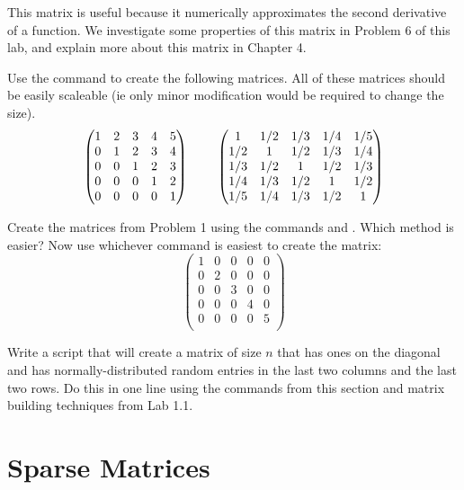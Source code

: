 This matrix is useful because it numerically approximates the second derivative of a function. We investigate some properties of this matrix in Problem 6 of this lab, and explain more about this matrix in Chapter 4.

\begin{problem}
Use the  command to create the following matrices. All of these matrices should be easily scaleable (ie only minor modification would be required to change the size).
\[
\begin{pmatrix}
1&2&3&4&5\\
0&1&2&3&4\\
0&0&1&2&3 \\
0&0&0&1&2 \\
0&0&0&0&1 \\
\end{pmatrix}
\hspace{8mm}
\begin{pmatrix}
1&1/2&1/3 & 1/4 &1/5\\
1/2&1&1/2&1/3&1/4\\
1/3&1/2&1&1/2&1/3 \\
1/4&1/3&1/2&1&1/2 \\
1/5&1/4&1/3&1/2&1 \\
\end{pmatrix}
\]

\end{problem}

\begin{problem}
Create the matrices from Problem 1 using the commands  and . Which method is easier? Now use whichever command is easiest to create the matrix:
\[
\begin{pmatrix}
1&0&0&0&0\\
0&2&0&0&0\\
0&0&3&0&0 \\
0&0&0&4&0 \\
0&0&0&0&5 \\
\end{pmatrix}
\]
\end{problem}
 
\begin{problem}
Write a script that will create a matrix of size $n$ that has ones on the diagonal and has normally-distributed random entries in the last two columns and the last two rows. Do this in one line using the commands from this section and matrix building techniques from Lab 1.1.
\end{problem}

\section*{Sparse Matrices}

